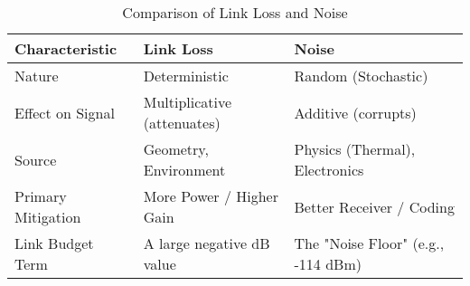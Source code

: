 \begin{table}[H]
    \centering
    \caption{Comparison of Link Loss and Noise}
    \label{tab:loss-vs-noise}
    \begin{tabular}{@{}lll@{}}
        \toprule
        \tableheaderfont Characteristic & \tableheaderfont Link Loss & \tableheaderfont Noise \\
        \midrule
        Nature & Deterministic & Random (Stochastic) \\
        Effect on Signal & Multiplicative (attenuates) & Additive (corrupts) \\
        Source & Geometry, Environment & Physics (Thermal), Electronics \\
        Primary Mitigation & More Power / Higher Gain & Better Receiver / Coding \\
        Link Budget Term & A large negative dB value & The "Noise Floor" (e.g., -114 dBm) \\
        \bottomrule
    \end{tabular}
\end{table}


